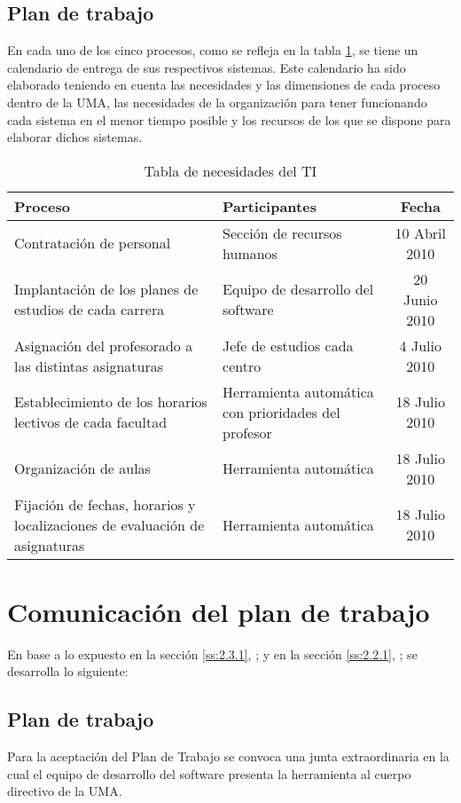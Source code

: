 \documentclass[11pt,a4paper,spanish,twoside]{book}
\begin{document}
\subsection{Plan de trabajo} \label{ss:2.3.1}
En cada uno de los cinco procesos, como se refleja en la tabla
\ref{Tab:NecTI}, se tiene un calendario de entrega de sus 
respectivos sistemas. Este calendario ha sido elaborado teniendo en cuenta
las necesidades y las dimensiones de cada proceso dentro de la UMA, las
necesidades de la organización para tener funcionando cada sistema en el menor
tiempo posible y los recursos de los que se dispone para elaborar dichos
sistemas. 

\begin{table}[!h]
\centering
  \begin{tabular}{p{4cm}p{5cm}c}
    \textbf{Proceso} & \textbf{Participantes} & \textbf{Fecha} \\
    \hline \hline
    Contratación de personal & Sección de recursos humanos & 10 Abril 2010\\ 
    \hline
    Implantación de los planes de estudios de cada carrera & Equipo de
    desarrollo del software & 20 Junio 2010\\
    \hline
    Asignación del profesorado a las distintas asignaturas & Jefe de estudios
    cada centro  & 4 Julio 2010\\
    \hline
    Establecimiento de los horarios lectivos de cada facultad & Herramienta
    automática con prioridades del profesor & 18 Julio 2010\\
    \hline
    Organización de aulas & Herramienta automática & 18 Julio 2010\\
    \hline
    Fijación de fechas, horarios y localizaciones de evaluación de
    asignaturas & Herramienta automática & 18 Julio 2010\\
    \hline
  \end{tabular}
  \caption{Tabla de necesidades del TI} \label{Tab:NecTI}
\end{table}

\section{Comunicación del plan de trabajo}
En base a lo expuesto en la sección \vref{ss:2.3.1},
\emph{}; y en la sección \vref{ss:2.2.1},
\emph{}; se desarrolla lo siguiente:

\subsection{Plan de trabajo}
Para la aceptación del Plan de Trabajo se convoca una junta extraordinaria en
la cual el equipo de desarrollo del software presenta la herramienta al
cuerpo directivo de la UMA.
\end{document}
